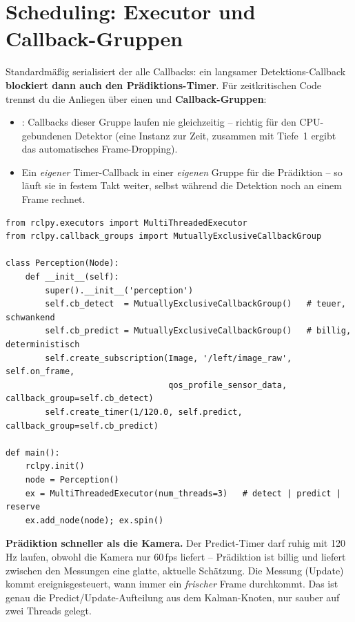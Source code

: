 \section{Scheduling: Executor und Callback-Gruppen}
Standardmäßig serialisiert der  alle Callbacks: ein
langsamer Detektions-Callback \textbf{blockiert dann auch den Prädiktions-Timer}.
Für zeitkritischen Code trennst du die Anliegen über einen
 und \textbf{Callback-Gruppen}:
\begin{itemize}
\item {}: Callbacks dieser Gruppe laufen nie
  gleichzeitig -- richtig für den CPU-gebundenen Detektor (eine Instanz zur Zeit,
  zusammen mit Tiefe~1 ergibt das automatisches Frame-Dropping).
\item Ein \emph{eigener} Timer-Callback in einer \emph{eigenen} Gruppe für die
  Prädiktion -- so läuft sie in festem Takt weiter, selbst während die Detektion
  noch an einem Frame rechnet.
\end{itemize}

\begin{lstlisting}[style=py,caption={Prädiktion und Detektion in getrennten Gruppen, parallel ausgeführt}]
from rclpy.executors import MultiThreadedExecutor
from rclpy.callback_groups import MutuallyExclusiveCallbackGroup

class Perception(Node):
    def __init__(self):
        super().__init__('perception')
        self.cb_detect  = MutuallyExclusiveCallbackGroup()   # teuer, schwankend
        self.cb_predict = MutuallyExclusiveCallbackGroup()   # billig, deterministisch
        self.create_subscription(Image, '/left/image_raw', self.on_frame,
                                 qos_profile_sensor_data, callback_group=self.cb_detect)
        self.create_timer(1/120.0, self.predict, callback_group=self.cb_predict)

def main():
    rclpy.init()
    node = Perception()
    ex = MultiThreadedExecutor(num_threads=3)   # detect | predict | reserve
    ex.add_node(node); ex.spin()
\end{lstlisting}

\noindent\textbf{Prädiktion schneller als die Kamera.} Der Predict-Timer darf
ruhig mit 120\,Hz laufen, obwohl die Kamera nur 60\,fps liefert -- Prädiktion ist
billig und liefert zwischen den Messungen eine glatte, aktuelle Schätzung. Die
Messung (Update) kommt ereignisgesteuert, wann immer ein \emph{frischer}
Frame durchkommt. Das ist genau die Predict/Update-Aufteilung aus dem Kalman-Knoten,
nur sauber auf zwei Threads gelegt.

